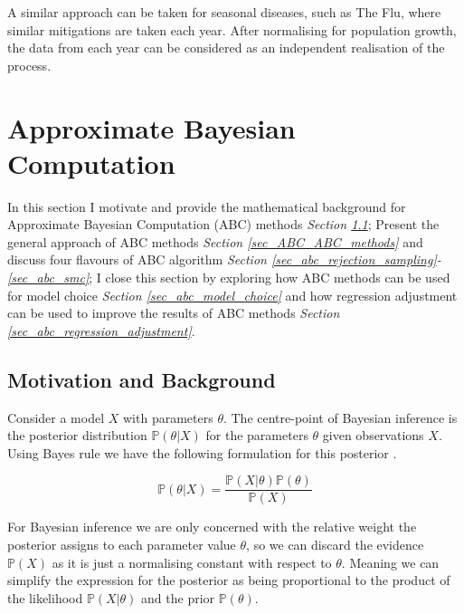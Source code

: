 \documentclass[11pt,a4paper]{article}
\newcommand*{\prob}{\mathbb{P}}
\theoremstyle{break}
\begin{document}
  \par A similar approach can be taken for seasonal diseases, such as The Flu, where similar mitigations are taken each year. After normalising for population growth, the data from each year can be considered as an independent realisation of the process.

\newpage
\section{Approximate Bayesian Computation}\label{sec_ABC}

  \par In this section I motivate and provide the mathematical background for Approximate Bayesian Computation (ABC) methods \textit{Section \ref{sec_ABC_background}}; Present the general approach of ABC methods \textit{Section \ref{sec_ABC_ABC_methods}} and discuss four flavours of ABC algorithm \textit{Section \ref{sec_abc_rejection_sampling}-\ref{sec_abc_smc}}; I close this section by exploring how ABC methods can be used for model choice \textit{Section \ref{sec_abc_model_choice}} and how regression adjustment can be used to improve the results of ABC methods \textit{Section \ref{sec_abc_regression_adjustment}}.

\subsection{Motivation and Background}\label{sec_ABC_background}


  \par Consider a model $X$ with parameters $\theta$. The centre-point of Bayesian inference is the posterior distribution $\prob(\theta|X)$ for the parameters $\theta$ given observations $X$. Using Bayes rule we have the following formulation for this posterior .

  \[ \prob(\theta|X)=\frac{\prob(X|\theta)\prob(\theta)}{\prob(X)} \]

  \par For Bayesian inference we are only concerned with the relative weight the posterior assigns to each parameter value $\theta$, so we can discard the evidence $\prob(X)$ as it is just a normalising constant with respect to $\theta$. Meaning we can simplify the expression for the posterior as being proportional to the product of the likelihood $\prob(X|\theta)$ and the prior $\prob(\theta)$.
\end{document}
